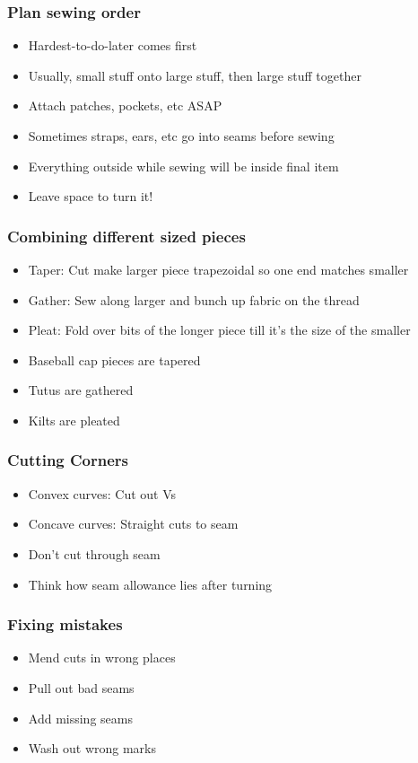 \documentclass{beamer}
\begin{document}
\begin{frame}[fragile]
\frametitle{Plan sewing order}
\begin{itemize}[<+(1)->]
\item Hardest-to-do-later comes first
\item Usually, small stuff onto large stuff, then large stuff together
\item Attach patches, pockets, etc ASAP
\item Sometimes straps, ears, etc go into seams before sewing
\item Everything outside while sewing will be inside final item
\item Leave space to turn it!
\end{itemize}
\end{frame}

\begin{frame}[fragile]
\frametitle{Combining different sized pieces}
\begin{itemize}[<+(1)->]
\item Taper: Cut make larger piece trapezoidal so one end matches smaller
\item Gather: Sew along larger and bunch up fabric on the thread
\item Pleat: Fold over bits of the longer piece till it's the size of the smaller
\item Baseball cap pieces are tapered
\item Tutus are gathered
\item Kilts are pleated
\end{itemize}
\end{frame}

\begin{frame}[fragile]
\frametitle{Cutting Corners}
\begin{itemize}[<+(1)->]
\item Convex curves: Cut out Vs
\item Concave curves: Straight cuts to seam
\item Don't cut through seam
\item Think how seam allowance lies after turning
\end{itemize}
\end{frame}


\begin{frame}[fragile]
\frametitle{Fixing mistakes}
\begin{itemize}[<+(1)->]
\item Mend cuts in wrong places
\item Pull out bad seams
\item Add missing seams
\item Wash out wrong marks
\end{itemize}
\end{frame}
\end{document}
